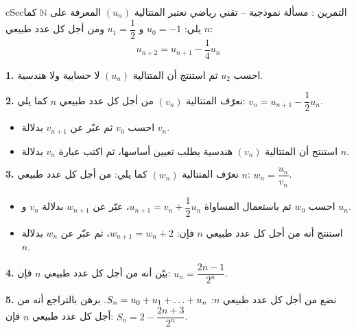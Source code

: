 \documentclass[12pt,a4paper]{article}
\newenvironment{BOX}[2]{\begin{otherlanguage}{english}\begin{arbox}{#1}{#2}}{\end{arbox}\end{otherlanguage}}
\newcounter{exo}
\newenvironment{tamrin}[1]{\stepcounter{exo}\begin{BOX}{cSec}{التمرين \theexo: #1}}{\end{BOX}}
\renewcommand{\dots}{\mathinner{\ldotp\ldotp\ldotp}}
\newcommand{\N}{\mathbb{N}}
\newenvironment{sq}{\begin{itemize}[leftmargin=2.4em,itemsep=3pt]}{\end{itemize}}
\newcommand{\qa}{\item[(أ)]}\newcommand{\qb}{\item[(ب)]}\newcommand{\qc}{\item[(جـ)]}\newcommand{\qd}{\item[(د)]}\newcommand{\qe}{\item[(هـ)]}
\newcommand{\QQ}[1]{\par\smallskip\textbf{#1.} }
\begin{document}
\begin{tamrin}{مسألة نموذجية -- تقني رياضي}
نعتبر المتتالية $(u_n)$ المعرفة على $\N$ كما يلي: $u_0=-1$ و $u_1=\dfrac12$ ومن أجل كل عدد طبيعي $n$:
\[u_{n+2}=u_{n+1}-\frac14u_n\]
\QQ{1} احسب $u_2$ ثم استنتج أن المتتالية $(u_n)$ لا حسابية ولا هندسية.

\QQ{2} نعرّف المتتالية $(v_n)$ من أجل كل عدد طبيعي $n$ كما يلي: $v_n=u_{n+1}-\dfrac12u_n$.
\begin{sq}
\qa احسب $v_0$ ثم عبّر عن $v_{n+1}$ بدلالة $v_n$.
\qb استنتج أن المتتالية $(v_n)$ هندسية يطلب تعيين أساسها، ثم اكتب عبارة $v_n$ بدلالة $n$.
\end{sq}
\QQ{3} نعرّف المتتالية $(w_n)$ كما يلي: من أجل كل عدد طبيعي $n$: $w_n=\dfrac{u_n}{v_n}$.
\begin{sq}
\qa احسب $w_0$ ثم باستعمال المساواة $u_{n+1}=v_n+\dfrac12u_n$، عبّر عن $w_{n+1}$ بدلالة $v_n$ و $u_n$.
\qb استنتج أنه من أجل كل عدد طبيعي $n$ فإن: $w_{n+1}=w_n+2$، ثم عبّر عن $w_n$ بدلالة $n$.
\end{sq}
\QQ{4} بيّن أنه من أجل كل عدد طبيعي $n$ فإن: $u_n=\dfrac{2n-1}{2^n}$.

\QQ{5} نضع من أجل كل عدد طبيعي $n$: $S_n=u_0+u_1+\dots+u_n$. برهن بالتراجع أنه من أجل كل عدد طبيعي $n$ فإن: $S_n=2-\dfrac{2n+3}{2^n}$.
\end{tamrin}
\end{document}
